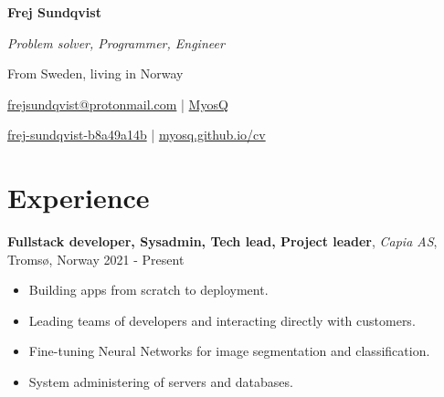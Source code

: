 \documentclass[11pt, a4paper]{article}
\begin{document}
\noindent
\begin{minipage}{0.25\textwidth}

\end{minipage}%
\begin{minipage}{0.75\textwidth}
    \centerline{
        \Large\bfseries Frej Sundqvist
    }
    \vspace{0.2em}
    \centerline{
        \textit{Problem solver, Programmer, Engineer}
    }
    \centerline{
        From Sweden, living in Norway
    }
    \vspace{0.5em}
    \centerline{
        {\faEnvelopeO} \href{mailto:frejsundqvist@protonmail.com}{frejsundqvist@protonmail.com}
        |
        {\faGithub} \href{https://github.com/MyosQ}{MyosQ}
    }
    \centerline{
        {\faLinkedin} \href{https://linkedin.com/in/frej-sundqvist-b8a49a14b}{frej-sundqvist-b8a49a14b}
        |
        {\faGlobe} \href{https://myosq.github.io/cv}{myosq.github.io/cv}    
    }
\end{minipage}

\vspace{1em}

\section*{Experience}
\textbf{Fullstack developer, Sysadmin, Tech lead, Project leader}, \textit{Capia AS}, Tromsø, Norway \hfill 2021 - Present
\begin{itemize}[noitemsep]
    \item Building apps from scratch to deployment.
    \item Leading teams of developers and interacting directly with customers.
    \item Fine-tuning Neural Networks for image segmentation and classification.
    \item System administering of servers and databases.
\end{itemize}
\end{document}
